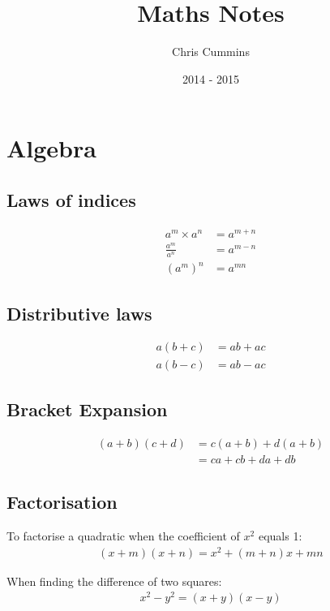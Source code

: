 \title{Maths Notes}
\author{Chris Cummins}
\date{2014 - 2015}



\sectionfont{\normalsize\selectfont\uppercase}
\subsectionfont{\normalsize\selectfont}


\maketitle
\tableofcontents

\newpage
\section{Algebra}

\subsection{Laws of indices}

\setcounter{equation}{0}
\begin{align}
a^m \times a^n &= a^{m+n}\\
\frac{a^m}{a^n} &= a^{m-n}\\
\left(a^m\right)^n &= a^{mn}
\end{align}

\subsection{Distributive laws}

\setcounter{equation}{0}
\begin{align}
a(b + c) &= ab + ac\\
a(b - c) &= ab - ac
\end{align}

\subsection{Bracket Expansion}
\setcounter{equation}{0}
\begin{align}
(a+b)(c+d) &= c(a+b) + d(a+b)\\
&= ca + cb + da + db
\end{align}

\subsection{Factorisation}

To factorise a quadratic when the coefficient of $x^2$ equals 1:
\setcounter{equation}{0}
\begin{align*}
(x+m)(x+n) = x^2+(m+n)x+mn
\end{align*}

When finding the difference of two squares:
\setcounter{equation}{0}
\begin{align*}
x^2-y^2 = (x+y)(x-y)
\end{align*}


